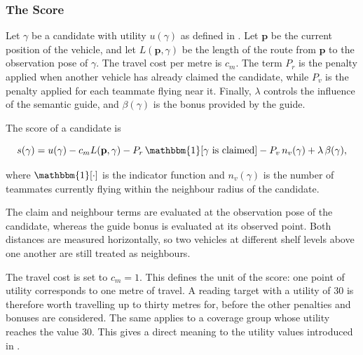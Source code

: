 \subsubsection*{The Score}

Let $\gamma$ be a candidate with utility $u(\gamma)$ as defined in
. Let $\mathbf{p}$ be the current position of the
vehicle, and let $L(\mathbf{p},\gamma)$ be the length of the route from
$\mathbf{p}$ to the observation pose of $\gamma$. The travel cost per metre is
$c_m$. The term $P_r$ is the penalty applied when another vehicle has already
claimed the candidate, while $P_v$ is the penalty applied for each teammate
flying near it. Finally, $\lambda$ controls the influence of the semantic guide,
and $\beta(\gamma)$ is the bonus provided by the guide.

The score of a candidate is

\begin{equation}
    s(\gamma)
    =
    u(\gamma)
    - c_m L(\mathbf{p},\gamma)
    - P_r\,\mathbbm{1}\!\left[\gamma \text{ is claimed}\right]
    - P_v\,n_v(\gamma)
    + \lambda\,\beta(\gamma),
    \label{eq:sys:score}
\end{equation}

where $\mathbbm{1}[\cdot]$ is the indicator function and $n_v(\gamma)$ is the
number of teammates currently flying within the neighbour radius of the
candidate.

The claim and neighbour terms are evaluated at the observation pose of the
candidate, whereas the guide bonus is evaluated at its observed point. Both
distances are measured horizontally, so two vehicles at different shelf levels
above one another are still treated as neighbours.

The travel cost is set to $c_m = 1$. This defines the unit of the score: one
point of utility corresponds to one metre of travel. A reading target with a
utility of 30 is therefore worth travelling up to thirty metres for, before the
other penalties and bonuses are considered. The same applies to a coverage group
whose utility reaches the value 30. This gives a direct meaning to the utility
values introduced in .

